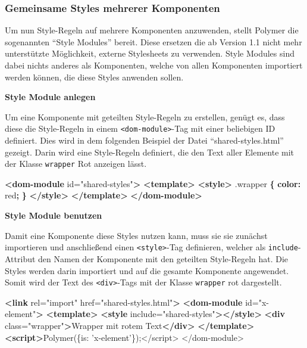 \documentclass[]{article}
\newenvironment{Shaded}{}{}
\newcommand{\KeywordTok}[1]{\textcolor[rgb]{0.00,0.44,0.13}{\textbf{{#1}}}}
\newcommand{\DataTypeTok}[1]{\textcolor[rgb]{0.56,0.13,0.00}{{#1}}}
\newcommand{\FloatTok}[1]{\textcolor[rgb]{0.25,0.63,0.44}{{#1}}}
\newcommand{\StringTok}[1]{\textcolor[rgb]{0.25,0.44,0.63}{{#1}}}
\newcommand{\SpecialStringTok}[1]{\textcolor[rgb]{0.73,0.40,0.53}{{#1}}}
\newcommand{\OtherTok}[1]{\textcolor[rgb]{0.00,0.44,0.13}{{#1}}}
\newcommand{\OperatorTok}[1]{\textcolor[rgb]{0.40,0.40,0.40}{{#1}}}
\newcommand{\AttributeTok}[1]{\textcolor[rgb]{0.49,0.56,0.16}{{#1}}}
\newcommand{\NormalTok}[1]{{#1}}
\begin{document}
\subsubsection{Gemeinsame Styles mehrerer
Komponenten}\label{gemeinsame-styles-mehrerer-komponenten}

Um nun Style-Regeln auf mehrere Komponenten anzuwenden, stellt Polymer
die sogenannten ``Style Modules'' bereit. Diese ersetzen die ab Version
1.1 nicht mehr unterstützte Möglichkeit, externe Stylesheets zu
verwenden. Style Modules sind dabei nichts anderes als Komponenten,
welche von allen Komponenten importiert werden können, die diese Styles
anwenden sollen.

\textbf{Style Module anlegen}

Um eine Komponente mit geteilten Style-Regeln zu erstellen, genügt es,
dass diese die Style-Regeln in einem
\texttt{\textless{}dom-module\textgreater{}}-Tag mit einer beliebigen ID
definiert. Dies wird in dem folgenden Beispiel der Datei
``shared-styles.html'' gezeigt. Darin wird eine Style-Regeln definiert,
die den Text aller Elemente mit der Klasse \texttt{wrapper} Rot anzeigen
lässt.

\begin{Shaded}
\begin{Highlighting}[]
\KeywordTok{<dom-module}\OtherTok{ id=}\StringTok{"shared-styles"}\KeywordTok{>}
  \KeywordTok{<template>}
    \KeywordTok{<style>}
      \FloatTok{.wrapper} \KeywordTok{\{} \KeywordTok{color:} \DataTypeTok{red}\KeywordTok{;} \KeywordTok{\}}
    \KeywordTok{</style>} 
  \KeywordTok{</template>}
\KeywordTok{</dom-module>}
\end{Highlighting}
\end{Shaded}

\textbf{Style Module benutzen}

Damit eine Komponente diese Styles nutzen kann, muss sie sie zunächst
importieren und anschließend einen
\texttt{\textless{}style\textgreater{}}-Tag definieren, welcher als
\texttt{include}-Attribut den Namen der Komponente mit den geteilten
Style-Regeln hat. Die Styles werden darin importiert und auf die gesamte
Komponente angewendet. Somit wird der Text des
\texttt{\textless{}div\textgreater{}}-Tags mit der Klasse
\texttt{wrapper} rot dargestellt.

\begin{Shaded}
\begin{Highlighting}[]
\KeywordTok{<link}\OtherTok{ rel=}\StringTok{"import"}\OtherTok{ href=}\StringTok{"shared-styles.html"}\KeywordTok{>}
\KeywordTok{<dom-module}\OtherTok{ id=}\StringTok{"x-element"}\KeywordTok{>}
  \KeywordTok{<template>}
    \KeywordTok{<style}\OtherTok{ include=}\StringTok{"shared-styles"}\KeywordTok{></style>}
    \KeywordTok{<div}\OtherTok{ class=}\StringTok{"wrapper"}\KeywordTok{>}\NormalTok{Wrapper mit rotem Text}\KeywordTok{</div>}
  \KeywordTok{</template>}
  \KeywordTok{<script>}\AttributeTok{Polymer}\NormalTok{(}\OperatorTok{\{}\DataTypeTok{is}\OperatorTok{:} \StringTok{'x-element'}\OperatorTok{\}}\NormalTok{)}\OperatorTok{;<}\SpecialStringTok{/script>}
\SpecialStringTok{</dom}\OperatorTok{-}\NormalTok{module}\OperatorTok{>}
\end{Highlighting}
\end{Shaded}
\end{document}
